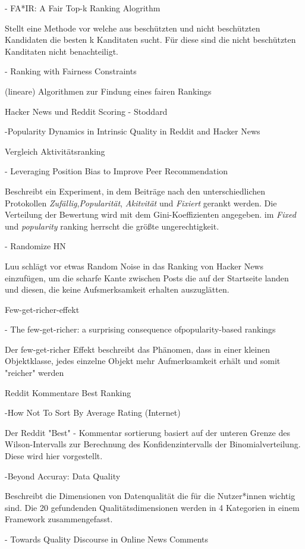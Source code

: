 - FA*IR: A Fair Top-k Ranking Alogrithm

Stellt eine Methode vor welche aus beschützten und nicht beschützten Kandidaten die besten k Kanditaten sucht. Für diese sind die nicht beschützten Kanditaten nicht benachteiligt.


- Ranking with Fairness Constraints

(lineare) Algorithmen zur Findung eines fairen Rankings

Hacker News und Reddit Scoring - Stoddard

-Popularity Dynamics in Intrinsic Quality in Reddit and Hacker News


Vergleich Aktivitätsranking

- Leveraging Position Bias to Improve Peer
Recommendation

Beschreibt ein Experiment, in dem Beiträge nach den unterschiedlichen Protokollen \textit{Zufällig},\textit{Popularität}, \textit{Akitvität} und \textit{Fixiert} gerankt werden. Die Verteilung der Bewertung wird mit dem Gini-Koeffizienten angegeben. im \textit{Fixed} und \textit{popularity} ranking herrscht die größte ungerechtigkeit.


- Randomize HN

Luu schlägt vor etwas Random Noise in das Ranking von Hacker News einzufügen, um die scharfe Kante zwischen Posts die auf der Startseite landen und diesen, die keine Aufsmerksamkeit erhalten auszuglätten.

Few-get-richer-effekt

- The few-get-richer: a surprising consequence ofpopularity-based rankings


Der few-get-richer Effekt beschreibt das Phänomen, dass in einer kleinen Objektklasse, jedes einzelne Objekt mehr Aufmerksamkeit erhält und somit "reicher" werden


Reddit Kommentare Best Ranking

-How Not To Sort By Average Rating (Internet)

Der Reddit "Best" - Kommentar sortierung basiert auf der unteren Grenze des Wilson-Intervalls zur Berechnung des Konfidenzintervalls der Binomialverteilung. Diese wird hier vorgestellt.


-Beyond Accuray: Data Quality

Beschreibt die Dimensionen von Datenqualität die für die Nutzer*innen wichtig sind. Die 20  gefundenden Qualitätsdimensionen werden in 4 Kategorien in einem Framework zusammengefasst.


- Towards Quality Discourse in Online News Comments

